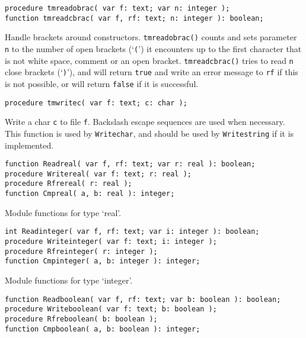 \documentclass{article}
\newenvironment{desc}{\nopagebreak\vspace{-\bigskipamount}\vspace{-\parskip}\begin{list}{}{\setlength{\topsep}{0pt}\setlength{\rightmargin}{0pt}}\item[]}{\end{list}}
\begin{document}
\begin{verbatim}
procedure tmreadobrac( var f: text; var n: integer );
function tmreadcbrac( var f, rf: text; n: integer ): boolean;
\end{verbatim}
\begin{desc}
Handle brackets around constructors.
{\tt tmreadobrac()} counts and sets parameter {\tt n} to the number
of open brackets (`{\tt (}') it encounters up to the first character
that is not white space, comment  or an open bracket.
{\tt tmreadcbrac()} tries to read {\tt n} close brackets (`{\tt )}'),
and will return {\tt true} and write an error message to {\tt rf} if this
is not possible,
or will return {\tt false} if it is successful.
\end{desc}
\begin{verbatim}
procedure tmwritec( var f: text; c: char );
\end{verbatim}
\begin{desc}
Write a char {\tt c} to file {\tt f}.
Backslash escape sequences are used when necessary.
This function is used by {\tt Writechar},
and should be used by {\tt Writestring} if it is implemented.
\end{desc}
\begin{verbatim}
function Readreal( var f, rf: text; var r: real ): boolean;
procedure Writereal( var f: text; r: real );
procedure Rfrereal( r: real );
function Cmpreal( a, b: real ): integer;
\end{verbatim}
\begin{desc}
Module functions for type `real'.
\end{desc}
\begin{verbatim}
int Readinteger( var f, rf: text; var i: integer ): boolean;
procedure Writeinteger( var f: text; i: integer );
procedure Rfreinteger( r: integer );
function Cmpinteger( a, b: integer ): integer;
\end{verbatim}
\begin{desc}
Module functions for type `integer'.
\end{desc}
\begin{verbatim}
function Readboolean( var f, rf: text; var b: boolean ): boolean;
procedure Writeboolean( var f: text; b: boolean );
procedure Rfreboolean( b: boolean );
function Cmpboolean( a, b: boolean ): integer;
\end{verbatim}
\end{document}
